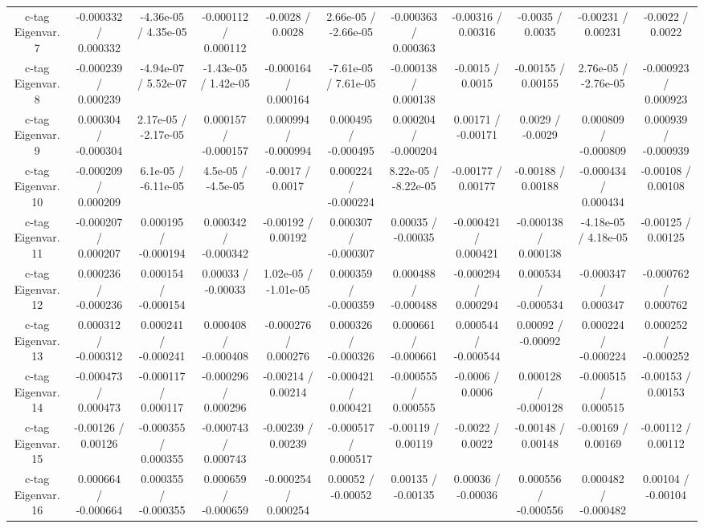 \begin{table}[htbp]
\begin{center}
\begin{tabular}{|c|c|c|c|c|c|c|c|c|c|c|}
  c-tag Eigenvar. 7 & -0.000332 / 0.000332 & -4.36e-05 / 4.35e-05 & -0.000112 / 0.000112 & -0.0028 / 0.0028 & 2.66e-05 / -2.66e-05 & -0.000363 / 0.000363 & -0.00316 / 0.00316 & -0.0035 / 0.0035 & -0.00231 / 0.00231 & -0.0022 / 0.0022 \\ 
  c-tag Eigenvar. 8 & -0.000239 / 0.000239 & -4.94e-07 / 5.52e-07 & -1.43e-05 / 1.42e-05 & -0.000164 / 0.000164 & -7.61e-05 / 7.61e-05 & -0.000138 / 0.000138 & -0.0015 / 0.0015 & -0.00155 / 0.00155 & 2.76e-05 / -2.76e-05 & -0.000923 / 0.000923 \\ 
  c-tag Eigenvar. 9 & 0.000304 / -0.000304 & 2.17e-05 / -2.17e-05 & 0.000157 / -0.000157 & 0.000994 / -0.000994 & 0.000495 / -0.000495 & 0.000204 / -0.000204 & 0.00171 / -0.00171 & 0.0029 / -0.0029 & 0.000809 / -0.000809 & 0.000939 / -0.000939 \\ 
  c-tag Eigenvar. 10 & -0.000209 / 0.000209 & 6.1e-05 / -6.11e-05 & 4.5e-05 / -4.5e-05 & -0.0017 / 0.0017 & 0.000224 / -0.000224 & 8.22e-05 / -8.22e-05 & -0.00177 / 0.00177 & -0.00188 / 0.00188 & -0.000434 / 0.000434 & -0.00108 / 0.00108 \\ 
  c-tag Eigenvar. 11 & -0.000207 / 0.000207 & 0.000195 / -0.000194 & 0.000342 / -0.000342 & -0.00192 / 0.00192 & 0.000307 / -0.000307 & 0.00035 / -0.00035 & -0.000421 / 0.000421 & -0.000138 / 0.000138 & -4.18e-05 / 4.18e-05 & -0.00125 / 0.00125 \\ 
  c-tag Eigenvar. 12 & 0.000236 / -0.000236 & 0.000154 / -0.000154 & 0.00033 / -0.00033 & 1.02e-05 / -1.01e-05 & 0.000359 / -0.000359 & 0.000488 / -0.000488 & -0.000294 / 0.000294 & 0.000534 / -0.000534 & -0.000347 / 0.000347 & -0.000762 / 0.000762 \\ 
  c-tag Eigenvar. 13 & 0.000312 / -0.000312 & 0.000241 / -0.000241 & 0.000408 / -0.000408 & -0.000276 / 0.000276 & 0.000326 / -0.000326 & 0.000661 / -0.000661 & 0.000544 / -0.000544 & 0.00092 / -0.00092 & 0.000224 / -0.000224 & 0.000252 / -0.000252 \\ 
  c-tag Eigenvar. 14 & -0.000473 / 0.000473 & -0.000117 / 0.000117 & -0.000296 / 0.000296 & -0.00214 / 0.00214 & -0.000421 / 0.000421 & -0.000555 / 0.000555 & -0.0006 / 0.0006 & 0.000128 / -0.000128 & -0.000515 / 0.000515 & -0.00153 / 0.00153 \\ 
  c-tag Eigenvar. 15 & -0.00126 / 0.00126 & -0.000355 / 0.000355 & -0.000743 / 0.000743 & -0.00239 / 0.00239 & -0.000517 / 0.000517 & -0.00119 / 0.00119 & -0.0022 / 0.0022 & -0.00148 / 0.00148 & -0.00169 / 0.00169 & -0.00112 / 0.00112 \\ 
  c-tag Eigenvar. 16 & 0.000664 / -0.000664 & 0.000355 / -0.000355 & 0.000659 / -0.000659 & -0.000254 / 0.000254 & 0.00052 / -0.00052 & 0.00135 / -0.00135 & 0.00036 / -0.00036 & 0.000556 / -0.000556 & 0.000482 / -0.000482 & 0.00104 / -0.00104 \\ 

\end{tabular}
\end{center}
\end{table}
